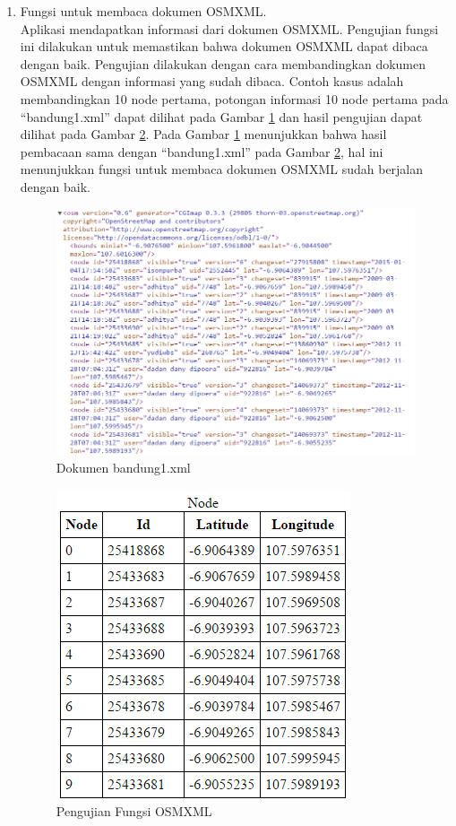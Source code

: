 \begin{enumerate}
  \item Fungsi untuk membaca dokumen OSMXML.\\
  Aplikasi mendapatkan informasi dari dokumen OSMXML. Pengujian
  fungsi ini dilakukan untuk memastikan bahwa dokumen OSMXML dapat dibaca dengan
  baik. Pengujian dilakukan dengan cara membandingkan dokumen OSMXML dengan
  informasi yang sudah dibaca. Contoh kasus adalah membandingkan 10 node
  pertama, potongan informasi 10 node pertama pada ``bandung1.xml'' dapat
  dilihat pada Gambar \ref{fig:pu_osmxml2} dan hasil pengujian dapat dilihat pada Gambar
  \ref{fig:pu_osmxml1}. Pada Gambar \ref{fig:pu_osmxml2} menunjukkan bahwa hasil
  pembacaan sama dengan ``bandung1.xml'' pada Gambar \ref{fig:pu_osmxml1}, hal
  ini menunjukkan fungsi untuk membaca dokumen OSMXML sudah berjalan dengan baik.
\begin{figure}[h]
\centering
\includegraphics[scale=0.7]{Gambar/pu_osmxml2}
\caption[Dokumen bandung1.xml]{Dokumen bandung1.xml}
\label{fig:pu_osmxml2}
\end{figure}

\begin{figure}[h]
\centering
\includegraphics[scale=1]{Gambar/pu_osmxml1}
\caption[Pengujian Fungsi OSMXML]{Pengujian Fungsi OSMXML}
\label{fig:pu_osmxml1}
\end{figure}
\clearpage


\end{enumerate}
